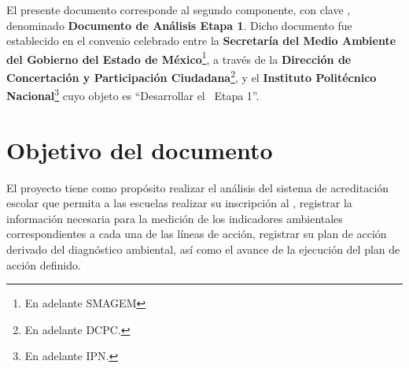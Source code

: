 
El presente documento corresponde al segundo componente, con clave \varCveDocumento, denominado {\bf Documento de Análisis Etapa 1}. Dicho documento fue establecido en el convenio celebrado entre la {\bf Secretaría del Medio Ambiente del Gobierno del Estado de México}\footnote{En adelante SMAGEM}, a través de la {\bf Dirección de Concertación y Participación Ciudadana}\footnote{En adelante DCPC.}, y el {\bf Instituto Politécnico Nacional}\footnote{En adelante IPN.} cuyo objeto es ``Desarrollar el \varSistema{}~Etapa 1''.
	
\section{Objetivo del documento}
    

	El proyecto tiene como propósito realizar el análisis del sistema de acreditación escolar que permita a las escuelas realizar su inscripción al \paear, registrar la información necesaria para la medición de los indicadores ambientales correspondientes a cada una de las líneas de acción, registrar su plan de acción derivado del diagnóstico ambiental, así como el avance de la ejecución del plan de acción definido. %

